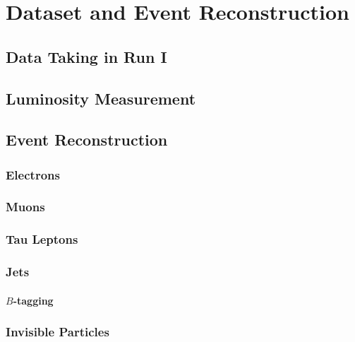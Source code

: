 \chapter{Dataset and Event Reconstruction}

\section{Data Taking in Run I}

\section{Luminosity Measurement}

\section{Event Reconstruction}


\subsection{Electrons}

\subsection{Muons}

\subsection{Tau Leptons}

\subsection{Jets}

\subsubsection{$B$-tagging}

\subsection{Invisible Particles}
